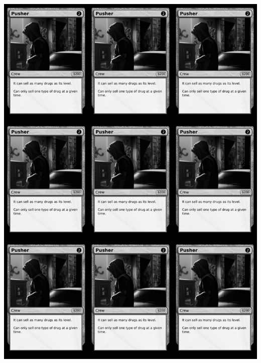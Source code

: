 \documentclass[a4paper]{article}
\begin{document}
\begin{center}
	\centering
	\includegraphics[width=190.5mm,height=266.7mm]{output/temp/page10.png}
\end{center}

\newpage
\end{document}
